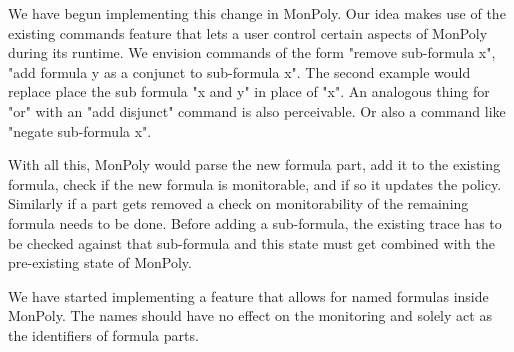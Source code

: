 We have begun implementing this change in MonPoly.
Our idea makes use of the existing commands feature that lets a user control certain aspects of MonPoly during its runtime.
We envision commands of the form "remove sub-formula x", "add formula y as a conjunct to sub-formula x".
The second example would replace place the sub formula "x and y" in place of "x".
An analogous thing for "or" with an "add disjunct" command is also perceivable.
Or also a command like "negate sub-formula x".

With all this, MonPoly would parse the new formula part, add it to the existing formula, check if the new formula is monitorable, and if so it updates the policy.
Similarly if a part gets removed a check on monitorability of the remaining formula needs to be done.
Before adding a sub-formula, the existing trace has to be checked against that sub-formula and this state must get combined with the pre-existing state of MonPoly.

We have started implementing a feature that allows for named formulas inside MonPoly.
The names should have no effect on the monitoring and solely act as the identifiers of formula parts.

